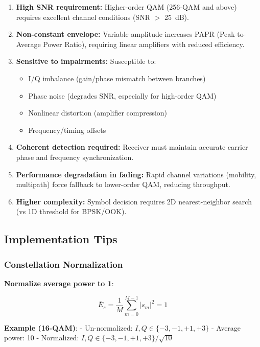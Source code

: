 \begin{enumerate}
\item \textbf{High SNR requirement:} Higher-order QAM (256-QAM and above) requires excellent channel conditions (SNR $>$ 25~dB).

\item \textbf{Non-constant envelope:} Variable amplitude increases PAPR (Peak-to-Average Power Ratio), requiring linear amplifiers with reduced efficiency.

\item \textbf{Sensitive to impairments:} Susceptible to:
  \begin{itemize}
  \item I/Q imbalance (gain/phase mismatch between branches)
  \item Phase noise (degrades SNR, especially for high-order QAM)
  \item Nonlinear distortion (amplifier compression)
  \item Frequency/timing offsets
  \end{itemize}

\item \textbf{Coherent detection required:} Receiver must maintain accurate carrier phase and frequency synchronization.

\item \textbf{Performance degradation in fading:} Rapid channel variations (mobility, multipath) force fallback to lower-order QAM, reducing throughput.

\item \textbf{Higher complexity:} Symbol decision requires 2D nearest-neighbor search (vs 1D threshold for BPSK/OOK).
\end{enumerate}

\subsection{Implementation Tips}

\subsubsection{Constellation
Normalization}\label{constellation-normalization}

\textbf{Normalize average power to 1}:

\[
\bar{E}_s = \frac{1}{M}\sum_{m=0}^{M-1} |s_m|^2 = 1
\]

\textbf{Example (16-QAM)}: - Un-normalized:
\(I, Q \in \{-3, -1, +1, +3\}\) - Average power: 10 - Normalized:
\(I, Q \in \{-3, -1, +1, +3\}/\sqrt{10}\)

